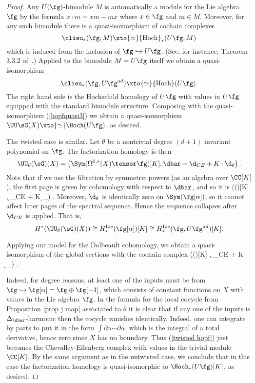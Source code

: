 \begin{proof}
Any $U(\fg)$-bimodule $M$ is automatically a module for the Lie algebra $\fg$ by the formula $x \cdot m = xm - mx$ where $x \in \fg$ and $m \in M$.
Moreover, for any such bimodule there is a quasi-isomorphism of cochain complexes 
\[
\clieu_*(\fg, M) \xto{\simeq} {\rm Hoch}_*(U\fg, M) 
\]
which is induced from the inclusion of $\fg \hookrightarrow U \fg$. 
(See, for instance, Theorem 3.3.2 of~\cite{LodayCyclic}.)
Applied to the bimodule $M = U\fg$ itself we obtain a quasi-isomorphism 
\[
\clieu_*(\fg , U\fg^{ad}) \xto{\simeq} {\rm Hoch}(U\fg).
\]
The right hand side is the Hochschild homology of $U\fg$ with values in $U\fg$ equipped with the standard bimodule structure. 
Composing with the quasi-isomorphism (\ref{hopfquasi3}) we obtain a quasi-isomorphism $\UU\sG(X) \xto{\simeq} \Hoch(U\fg)$, as desired.

The twisted case is similar. 
Let $\theta$ be a nontrivial degree $(d+1)$ invariant polynomial on $\fg$. 
The factorization homology is then 
\[
\UU_\theta (\sG)(X) = \left(\Sym(\Omega^{0,*}(X) \tensor \fg)[K] , \dbar + \d_{CE} + K \cdot \d_\theta\right) .
\]
Note that if we use the filtration by symmetric powers (as an algebra over $\CC[K]$),
the first page is given by cohomology with respect to $\dbar$,
and so it is
\beqn\label{twisted hopf}
\left(\Sym(\fg[\alpha])[K] ,  \d_{CE} + K \cdot \d_\theta \right) .
\eeqn
Moreover, $\d_\theta$ is identically zero on $\Sym(\fg[\alpha])$, so it cannot affect later pages of the spectral sequence. 
Hence the sequence collapses after $\d_{CE}$ is applied.
That is, 
\[
H^*(\UU_\theta (\sG)(X)) \cong H^{\rm Lie}_*(\fg[\alpha])[K] \cong H^{\rm Lie}_*(\fg, U\fg^{ad})[K].
\]

Applying our model for the Dolbeault cohomology, we obtain a quasi-isomorphism of the global sections with the cochain complex
\beqn\label{twisted hopf}
\left(\Sym(\fg[\alpha])[K] ,  \d_{CE} + K \cdot \d_\theta \right) .
\eeqn

Indeed, for degree reasons, at least one of the inputs must be from $\fg \hookrightarrow \fg[\alpha] = \fg \oplus \fg[-1]$, which consists of constant functions on $X$ with values in the Lie algebra $\fg$. 
In the formula for the local cocycle from Proposition \ref{prop j map} associated to $\theta$ it is clear that if any one of the inputs is $\Delta_{\dbar}$-harmonic then the cocycle vanishes identically. 
Indeed, one can integrate by parts to put it in the form $\int \partial \alpha \cdots \partial \alpha$, which is the integral of a total derivative, hence zero since $X$ has no boundary.
Thus (\ref{twisted hopf}) just becomes the Chevalley-Eilenberg complex with values in the trivial module $\CC[K]$. 
By the same argument as in the untwisted case, we conclude that in this case the factorization homology is quasi-isomorphic to $\Hoch_*(U \fg)[K]$, as desired.
\end{proof}

